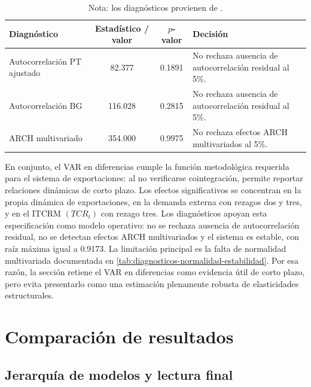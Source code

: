\documentclass[11pt,a4paper]{article}
\begin{document}
\begin{table}[H]
\centering
\caption{Diagnósticos residuales del VAR en diferencias de exportaciones.}
\label{tab:diagnosticos-var-diferencias-exportaciones}
\small
\begin{tabular}{lccp{6.2cm}}
\toprule
Diagnóstico & Estadístico / valor & \(p\)-valor & Decisión \\
\midrule
Autocorrelación PT ajustado & 82.377 & 0.1891 & No rechaza ausencia de autocorrelación residual al 5\%. \\
Autocorrelación BG & 116.028 & 0.2815 & No rechaza ausencia de autocorrelación residual al 5\%. \\
ARCH multivariado & 354.000 & 0.9975 & No rechaza efectos ARCH multivariados al 5\%. \\
\bottomrule
\end{tabular}
\caption*{\footnotesize Nota: los diagnósticos provienen de
.}
\end{table}

En conjunto, el VAR en diferencias cumple la función metodológica requerida
para el sistema de exportaciones: al no verificarse cointegración, permite
reportar relaciones dinámicas de corto plazo. Los efectos significativos se
concentran en la propia dinámica de exportaciones, en la demanda externa con
rezagos dos y tres, y en el ITCRM \((TCR_t)\) con rezago tres. Los diagnósticos
apoyan esta especificación como modelo operativo: no se rechaza ausencia de
autocorrelación residual, no se detectan efectos ARCH multivariados y el
sistema es estable, con raíz máxima igual a 0.9173. La limitación principal es
la falta de normalidad multivariada documentada en
\autoref{tab:diagnosticos-normalidad-estabilidad}. Por esa razón, la sección
retiene el VAR en diferencias como evidencia útil de corto plazo, pero evita
presentarlo como una estimación plenamente robusta de elasticidades
estructurales.

	\section{Comparación de resultados}
	\label{sec:comparacion}

	\subsection{Jerarquía de modelos y lectura final}
	\label{subsec:jerarquia-modelos}
\end{document}
